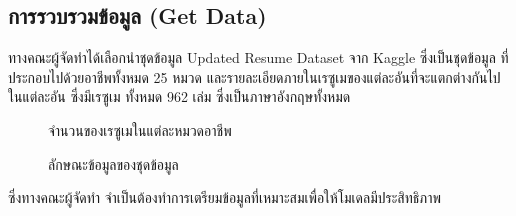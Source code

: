 \subsection{การรวบรวมข้อมูล (Get Data)}
\label{subsec:Data Collecting}
ทางคณะผู้จัดทำได้เลือกนำชุดข้อมูล Updated Resume Dataset \cite{dataset} จาก Kaggle ซึ่งเป็นชุดข้อมูล
ที่ประกอบไปด้วยอาชีพทั้งหมด 25 หมวด และรายละเอียดภายในเรซูเมของแต่ละอันที่จะแตกต่างกันไปในแต่ละอัน ซึ่งมีเรซูเม
ทั้งหมด 962 เล่ม ซึ่งเป็นภาษาอังกฤษทั้งหมด
\begin{figure}[h]\centering
    \setlength{\fboxrule}{0.2mm} %
    \setlength{\fboxsep}{0.5cm}
    \caption{จำนวนของเรซูเมในแต่ละหมวดอาชีพ}\label{fig:datasetCategory}
\end{figure}
\begin{figure}[h]\centering
    \setlength{\fboxrule}{0.2mm} %
    \setlength{\fboxsep}{0.5cm}
    \caption{ลักษณะข้อมูลของชุดข้อมูล}\label{fig:datasetData}
\end{figure}
\par ซึ่งทางคณะผู้จัดทำ จำเป็นต้องทำการเตรียมข้อมูลที่เหมาะสมเพื่อให้โมเดลมีประสิทธิภาพ

